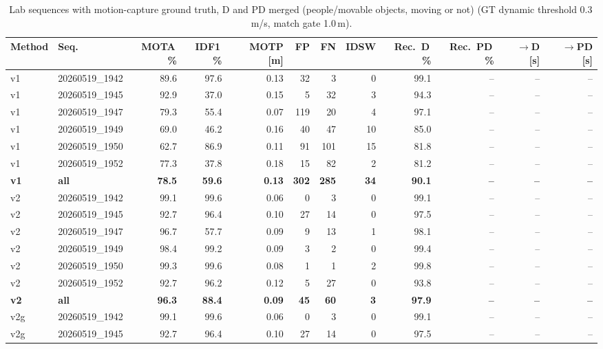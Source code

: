 \begin{table}[t]
\centering
\caption{Lab sequences with motion-capture ground truth, D and PD merged (people/movable objects, moving or not) (GT dynamic threshold 0.3\,m/s, match gate 1.0\,m).}
\label{tab:own_r8b_merged}
\setlength{\tabcolsep}{3pt}
\begin{tabular}{llrrrrrrrrrr}
\toprule
Method & Seq. & MOTA\,\% & IDF1\,\% & MOTP [m] & FP & FN & IDSW & Rec.\ D\,\% & Rec.\ PD\,\% & $\to$D [s] & $\to$PD [s] \\
\midrule
v1 & 20260519\_1942 & 89.6 & 97.6 & 0.13 & 32 & 3 & 0 & 99.1 & -- & -- & -- \\
v1 & 20260519\_1945 & 92.9 & 37.0 & 0.15 & 5 & 32 & 3 & 94.3 & -- & -- & -- \\
v1 & 20260519\_1947 & 79.3 & 55.4 & 0.07 & 119 & 20 & 4 & 97.1 & -- & -- & -- \\
v1 & 20260519\_1949 & 69.0 & 46.2 & 0.16 & 40 & 47 & 10 & 85.0 & -- & -- & -- \\
v1 & 20260519\_1950 & 62.7 & 86.9 & 0.11 & 91 & 101 & 15 & 81.8 & -- & -- & -- \\
v1 & 20260519\_1952 & 77.3 & 37.8 & 0.18 & 15 & 82 & 2 & 81.2 & -- & -- & -- \\
\textbf{v1} & \textbf{all} & \textbf{78.5} & \textbf{59.6} & \textbf{0.13} & \textbf{302} & \textbf{285} & \textbf{34} & \textbf{90.1} & \textbf{--} & \textbf{--} & \textbf{--} \\
\midrule
v2 & 20260519\_1942 & 99.1 & 99.6 & 0.06 & 0 & 3 & 0 & 99.1 & -- & -- & -- \\
v2 & 20260519\_1945 & 92.7 & 96.4 & 0.10 & 27 & 14 & 0 & 97.5 & -- & -- & -- \\
v2 & 20260519\_1947 & 96.7 & 57.7 & 0.09 & 9 & 13 & 1 & 98.1 & -- & -- & -- \\
v2 & 20260519\_1949 & 98.4 & 99.2 & 0.09 & 3 & 2 & 0 & 99.4 & -- & -- & -- \\
v2 & 20260519\_1950 & 99.3 & 99.6 & 0.08 & 1 & 1 & 2 & 99.8 & -- & -- & -- \\
v2 & 20260519\_1952 & 92.7 & 96.2 & 0.12 & 5 & 27 & 0 & 93.8 & -- & -- & -- \\
\textbf{v2} & \textbf{all} & \textbf{96.3} & \textbf{88.4} & \textbf{0.09} & \textbf{45} & \textbf{60} & \textbf{3} & \textbf{97.9} & \textbf{--} & \textbf{--} & \textbf{--} \\
\midrule
v2g & 20260519\_1942 & 99.1 & 99.6 & 0.06 & 0 & 3 & 0 & 99.1 & -- & -- & -- \\
v2g & 20260519\_1945 & 92.7 & 96.4 & 0.10 & 27 & 14 & 0 & 97.5 & -- & -- & -- \\

\end{tabular}
\end{table}
